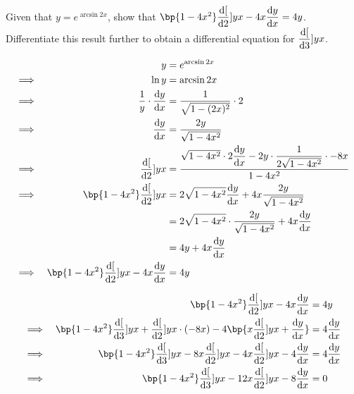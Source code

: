 \documentclass{echw}
\begin{document}
    \problem{}
        Given that $y = e^{\arcsin{2x}}$, show that $\bp{1-4x^2}\der[2]{y}{x} - 4x\der{y}{x} = 4y$. Differentiate this result further to obtain a differential equation for $\dfrac{\mathrm{d} [}{\mathrm{d} 3}]{y}{x}$.

    \solution
        \begin{alignat*}{2}
            &&y &= e^{\arcsin{2x}}\\
            \implies&& \ln y &= \arcsin{2x}\\
            \implies&& \dfrac1y \cdot \der{y}{x} &= \dfrac{1}{\sqrt{1 - (2x)^2}} \cdot 2\\
            \implies&& \der{y}{x} &= \dfrac{2y}{\sqrt{1 - 4x^2}}\\
            \implies&& \der[2]{y}{x} &= \dfrac{\sqrt{1 - 4x^2} \cdot 2\der{y}{x} - 2y \cdot \dfrac{1}{2\sqrt{1-4x^2}} \cdot -8x}{1-4x^2}\\
            \implies&& \bp{1-4x^2}\der[2]{y}{x} &= 2\sqrt{1 - 4x^2} \der{y}{x} + 4x \dfrac{2y}{\sqrt{1-4x^2}}\\
            && &= 2\sqrt{1 - 4x^2} \cdot \dfrac{2y}{\sqrt{1 - 4x^2}} + 4x \der{y}{x} \\
            && &= 4y + 4x \der{y}{x} \\
            \implies&& \bp{1-4x^2}\der[2]{y}{x} -4x \der{y}{x} &= 4y \\
        \end{alignat*}

        \begin{alignat*}{2}
            && \bp{1-4x^2}\der[2]{y}{x} -4x \der{y}{x} &= 4y\\
            \implies&&\bp{1 - 4x^2} \der[3]{y}{x} + \der[2]{y}{x} \cdot (-8x) - 4\bp{x  \der[2]{y}{x} + \der{y}{x} } &= 4\der{y}{x}\\
            \implies&&\bp{1 - 4x^2} \der[3]{y}{x} -8x \der[2]{y}{x} - 4x  \der[2]{y}{x} - 4\der{y}{x} &= 4\der{y}{x}\\
            \implies&&\bp{1 - 4x^2} \der[3]{y}{x} -12x \der[2]{y}{x} - 8\der{y}{x} &= 0
        \end{alignat*}

\end{document}
